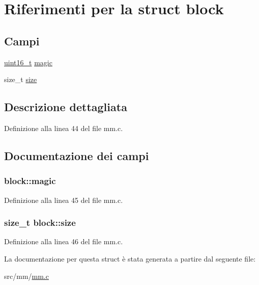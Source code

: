 \hypertarget{structblock}{\section{Riferimenti per la struct block}
\label{structblock}
}
\subsection*{Campi}
\begin{DoxyCompactItemize}
\item 
\hyperlink{aplus_8h_a5a8b2dc9e45a9ee81a94ef304fb62505}{uint16\+\_\+t} \hyperlink{structblock_a0dc8afecb033f59b42e0d8502a7f8ff0}{magic}
\item 
size\+\_\+t \hyperlink{structblock_a40c8e08013eb90aa6db19e1cbc7f3186}{size}
\end{DoxyCompactItemize}


\subsection{Descrizione dettagliata}


Definizione alla linea 44 del file mm.\+c.



\subsection{Documentazione dei campi}
\hypertarget{structblock_a0dc8afecb033f59b42e0d8502a7f8ff0}{
\subsubsection[{magic}]{ block\+::magic}}\label{structblock_a0dc8afecb033f59b42e0d8502a7f8ff0}


Definizione alla linea 45 del file mm.\+c.

\hypertarget{structblock_a40c8e08013eb90aa6db19e1cbc7f3186}{
\subsubsection[{size}]{\setlength{\rightskip}{0pt plus 5cm}size\+\_\+t block\+::size}}\label{structblock_a40c8e08013eb90aa6db19e1cbc7f3186}


Definizione alla linea 46 del file mm.\+c.



La documentazione per questa struct è stata generata a partire dal seguente file\+:\begin{DoxyCompactItemize}
\item 
src/mm/\hyperlink{mm_8c}{mm.\+c}\end{DoxyCompactItemize}
